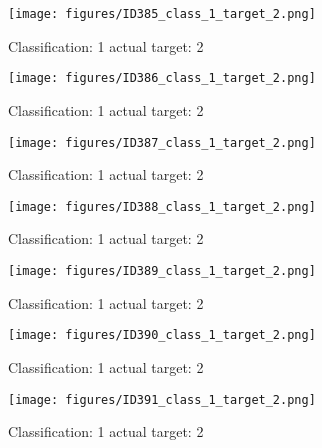 \begin{figure}[h!]
\begin{center}
\texttt{[image: figures/ID385\_class\_1\_target\_2.png]}
\end{center}
\caption{ Classification: 1 actual target: 2}
\label{fig:ID385_class_1_target_2}
\end{figure}
\begin{figure}[h!]
\begin{center}
\texttt{[image: figures/ID386\_class\_1\_target\_2.png]}
\end{center}
\caption{ Classification: 1 actual target: 2}
\label{fig:ID386_class_1_target_2}
\end{figure}
\begin{figure}[h!]
\begin{center}
\texttt{[image: figures/ID387\_class\_1\_target\_2.png]}
\end{center}
\caption{ Classification: 1 actual target: 2}
\label{fig:ID387_class_1_target_2}
\end{figure}
\begin{figure}[h!]
\begin{center}
\texttt{[image: figures/ID388\_class\_1\_target\_2.png]}
\end{center}
\caption{ Classification: 1 actual target: 2}
\label{fig:ID388_class_1_target_2}
\end{figure}
\begin{figure}[h!]
\begin{center}
\texttt{[image: figures/ID389\_class\_1\_target\_2.png]}
\end{center}
\caption{ Classification: 1 actual target: 2}
\label{fig:ID389_class_1_target_2}
\end{figure}
\begin{figure}[h!]
\begin{center}
\texttt{[image: figures/ID390\_class\_1\_target\_2.png]}
\end{center}
\caption{ Classification: 1 actual target: 2}
\label{fig:ID390_class_1_target_2}
\end{figure}
\begin{figure}[h!]
\begin{center}
\texttt{[image: figures/ID391\_class\_1\_target\_2.png]}
\end{center}
\caption{ Classification: 1 actual target: 2}
\label{fig:ID391_class_1_target_2}
\end{figure}
